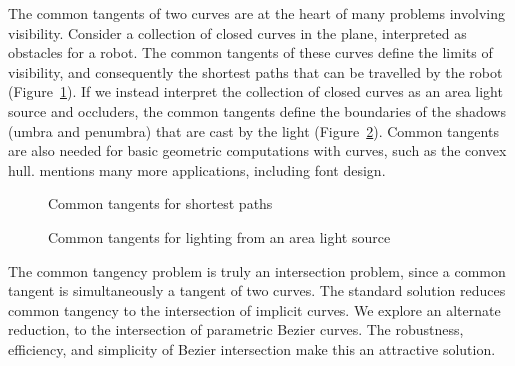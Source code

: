 \documentclass[10pt,twocolumn]{article}
\begin{document}
The common tangents of two curves are at the heart of many problems
involving visibility.
Consider a collection of closed curves in the plane, interpreted as 
obstacles for a robot.
The common tangents of these curves define the limits of visibility,
and consequently the shortest paths that can be travelled by the robot
(Figure~\ref{fig:applications}).
If we instead interpret the collection of closed curves as 
an area light source and occluders,
the common tangents define the boundaries of the shadows (umbra and 
penumbra) that are cast by the light (Figure~\ref{fig:appl2}).
Common tangents are also needed for basic geometric computations with curves,
such as the convex hull.
\cite{parida95} mentions many more applications, including font design.



\begin{figure}
\hspace{1in} \setjjdush
\caption{Common tangents for shortest paths}
\label{fig:applications}
\end{figure}



\begin{figure}
\hspace{1in} \setjjdulig
\caption{Common tangents for lighting from an area light source}
\label{fig:appl2}
\end{figure}

The common tangency problem is truly an intersection problem,
since a common tangent is simultaneously a tangent of two curves.
The standard solution reduces common tangency to the intersection of implicit curves.
We explore an alternate reduction, 
to the intersection of parametric Bezier curves.
The robustness, efficiency, and simplicity of Bezier intersection
make this an attractive solution.
\end{document}
